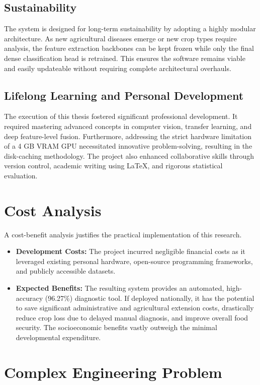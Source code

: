 \subsection{Sustainability}
The system is designed for long-term sustainability by adopting a highly modular architecture. As new agricultural diseases emerge or new crop types require analysis, the feature extraction backbones can be kept frozen while only the final dense classification head is retrained. This ensures the software remains viable and easily updateable without requiring complete architectural overhauls.

\subsection{Lifelong Learning and Personal Development}
The execution of this thesis fostered significant professional development. It required mastering advanced concepts in computer vision, transfer learning, and deep feature-level fusion. Furthermore, addressing the strict hardware limitation of a 4 GB VRAM GPU necessitated innovative problem-solving, resulting in the disk-caching methodology. The project also enhanced collaborative skills through version control, academic writing using LaTeX, and rigorous statistical evaluation.

\section{Cost Analysis}

A cost-benefit analysis justifies the practical implementation of this research. 
\begin{itemize}
    \item \textbf{Development Costs:} The project incurred negligible financial costs as it leveraged existing personal hardware, open-source programming frameworks, and publicly accessible datasets. 
    \item \textbf{Expected Benefits:} The resulting system provides an automated, high-accuracy (96.27\%) diagnostic tool. If deployed nationally, it has the potential to save significant administrative and agricultural extension costs, drastically reduce crop loss due to delayed manual diagnosis, and improve overall food security. The socioeconomic benefits vastly outweigh the minimal developmental expenditure.
\end{itemize}

\section{Complex Engineering Problem}

